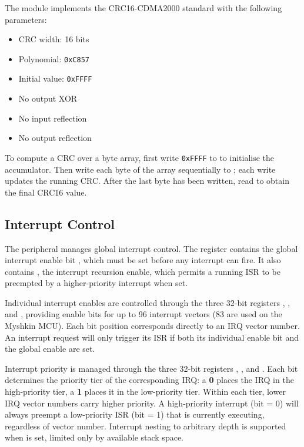 The module implements the CRC16-CDMA2000 standard with the following parameters:
\begin{itemize}
\item CRC width: 16 bits
\item Polynomial: \texttt{0xC857}
\item Initial value: \texttt{0xFFFF}
\item No output XOR
\item No input reflection
\item No output reflection
\end{itemize}

To compute a CRC over a byte array, first write \texttt{0xFFFF} to  to initialise the accumulator. Then write each byte of the array sequentially to ; each write updates the running CRC. After the last byte has been written, read  to obtain the final CRC16 value.



\subsection{Interrupt Control}

The  peripheral manages global interrupt control. The  register contains the global interrupt enable bit , which must be set before any interrupt can fire. It also contains , the interrupt recursion enable, which permits a running ISR to be preempted by a higher-priority interrupt when set.

Individual interrupt enables are controlled through the three 32-bit registers , , and , providing enable bits for up to 96 interrupt vectors (83 are used on the Myshkin MCU). Each bit position corresponds directly to an IRQ vector number. An interrupt request will only trigger its ISR if both its individual enable bit and the global enable  are set.

Interrupt priority is managed through the three 32-bit registers , , and . Each bit determines the priority tier of the corresponding IRQ: a \textbf{0} places the IRQ in the high-priority tier, a \textbf{1} places it in the low-priority tier. Within each tier, lower IRQ vector numbers carry higher priority. A high-priority interrupt (bit = 0) will always preempt a low-priority ISR (bit = 1) that is currently executing, regardless of vector number. Interrupt nesting to arbitrary depth is supported when  is set, limited only by available stack space.



